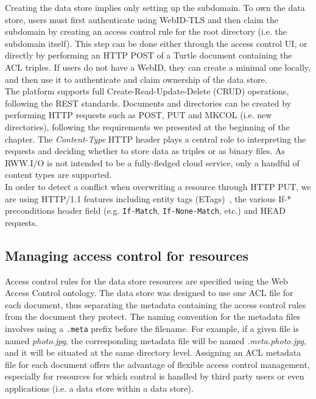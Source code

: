 Creating the data store implies only setting up the subdomain. To own the data store, users must first authenticate using WebID-TLS and then claim the subdomain by creating an access control rule for the root directory (i.e. the subdomain itself). This step can be done either through the access control UI, or directly by performing an HTTP POST of a Turtle document containing the ACL triples. If users do not have a WebID, they can create a minimal one locally, and then use it to authenticate and claim ownership of the data store.\\

The platform supports full Create-Read-Update-Delete (CRUD) operations, following the REST standards. Documents and directories can be created by performing HTTP requests such as POST, PUT and MKCOL (i.e. new directories), following the requirements we presented at the beginning of the chapter. The \textit{Content-Type} HTTP header plays a central role to interpreting the requests and deciding whether to store data as triples or as binary files. As RWW.I/O is not intended to be a fully-fledged cloud service, only a handful of content types are supported.\\

In order to detect a conflict when overwriting a resource through HTTP PUT, we are using HTTP/1.1 features including entity tags (ETags)~\cite{nielsen1999editing}, the various If-* preconditions header field (e.g. \verb+If-Match+, \verb+If-None-Match+, etc.) and HEAD requests.

\subsection{Managing access control for resources}
Access control rules for the data store resources are specified using the Web Access Control ontology. The data store was designed to use one ACL file for each document, thus separating the metadata containing the access control rules from the document they protect. The naming convention for the metadata files involves using a \verb+.meta+ prefix before the filename. For example, if a given file is named \textit{photo.jpg}, the corresponding metadata file will be named \textit{.meta.photo.jpg}, and it will be situated at the same directory level. Assigning an ACL metadata file for each document offers the advantage of flexible access control management, especially for resources for which control is handled by third party users or even applications (i.e. a data store within a data store).\\

